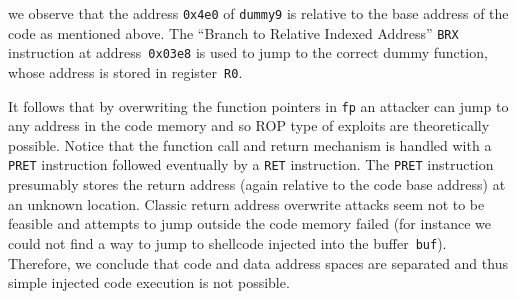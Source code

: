 \documentclass[11pt]{llncs}
\begin{document}
we observe that the address \texttt{0x4e0} of \texttt{dummy9} is relative to the base address of the code as mentioned above. 
The ``Branch to Relative Indexed Address'' \texttt{BRX} instruction at address~\texttt{0x03e8} is used to jump to the correct dummy function, whose address is stored in register~\texttt{R0}.

It follows that by overwriting the function pointers in \texttt{fp} an attacker can jump to any address in the code memory and so ROP type of exploits are theoretically possible.
Notice that the function call and return mechanism is handled with a \texttt{PRET} instruction followed eventually by a \texttt{RET} instruction. The \texttt{PRET} instruction presumably stores the return address (again relative to the code base address) at an unknown location.
Classic return address overwrite attacks seem not to be feasible and attempts to jump outside the code memory failed (for instance we could not find a way to jump to shellcode injected into the buffer~\texttt{buf}).
Therefore, we conclude that code and data address spaces are separated and thus simple injected code execution is not possible.
\end{document}
